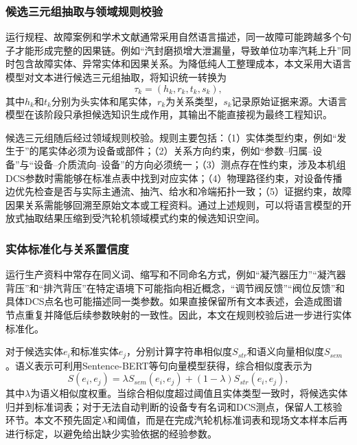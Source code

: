 \subsubsection{候选三元组抽取与领域规则校验}

运行规程、故障案例和学术文献通常采用自然语言描述，同一故障可能跨越多个句子才能形成完整的因果链。例如“汽封磨损增大泄漏量，导致单位功率汽耗上升”同时包含故障实体、异常实体和因果关系。为降低纯人工整理成本，本文采用大语言模型对文本进行候选三元组抽取，将知识统一转换为
\begin{equation}
    \tau_k=(h_k,r_k,t_k,s_k),
\end{equation}
其中$h_k$和$t_k$分别为头实体和尾实体，$r_k$为关系类型，$s_k$记录原始证据来源。大语言模型在该阶段只承担候选知识生成作用，其输出不能直接视为最终工程知识。

候选三元组随后经过领域规则校验。规则主要包括：（1）实体类型约束，例如“发生于”的尾实体必须为设备或部件；（2）关系方向约束，例如“参数--归属--设备”与“设备--介质流向--设备”的方向必须统一；（3）测点存在性约束，涉及本机组DCS参数时需能够在标准点表中找到对应实体；（4）物理路径约束，对设备传播边优先检查是否与实际主通流、抽汽、给水和冷端拓扑一致；（5）证据约束，故障因果关系需能够回溯至原始文本或工程资料。通过上述规则，可以将语言模型的开放式抽取结果压缩到受汽轮机领域模式约束的候选知识空间。

\subsubsection{实体标准化与关系置信度}

运行生产资料中常存在同义词、缩写和不同命名方式，例如“凝汽器压力”“凝汽器背压”和“排汽背压”在特定语境下可能指向相近概念，“调节阀反馈”“阀位反馈”和具体DCS点名也可能描述同一类参数。如果直接保留所有文本表述，会造成图谱节点重复并降低后续参数映射的一致性。因此，本文在规则校验后进一步进行实体标准化。

对于候选实体$e_i$和标准实体$e_j$，分别计算字符串相似度$S_{str}$和语义向量相似度$S_{sem}$。语义表示可利用Sentence-BERT等句向量模型获得\cite{Reimers2019SentenceBERT}，综合相似度表示为
\begin{equation}
S(e_i,e_j)=\lambda S_{sem}(e_i,e_j)+(1-\lambda)S_{str}(e_i,e_j),
\label{eq:entity_similarity}
\end{equation}
其中$\lambda$为语义相似度权重。当综合相似度超过阈值且实体类型一致时，将候选实体归并到标准词表；对于无法自动判断的设备专有名词和DCS测点，保留人工核验环节。本文不预先固定$\lambda$和阈值，而是在完成汽轮机标准词表和现场文本样本后再进行标定，以避免给出缺少实验依据的经验参数。

